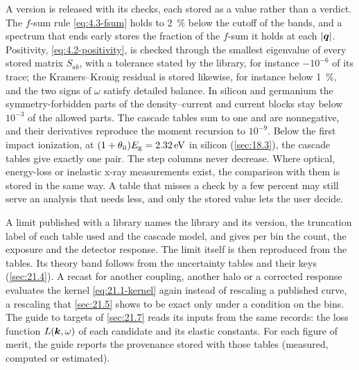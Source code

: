 A version is released with its checks, each stored as a value rather than a verdict. The $f$-sum rule \cref{eq:4.3-fsum} holds to \SI{2}{\percent} below the cutoff of the bands, and a spectrum that ends early stores the fraction of the $f$-sum it holds at each $|\bm{q}|$. Positivity, \cref{eq:4.2-positivity}, is checked through the smallest eigenvalue of every stored matrix $S_{ab}$, with a tolerance stated by the library, for instance $-10^{-6}$ of its trace; the Kramers--Kronig residual is stored likewise, for instance below \SI{1}{\percent}, and the two signs of $\omega$ satisfy detailed balance. In silicon and germanium the symmetry-forbidden parts of the density--current and current blocks stay below $10^{-3}$ of the allowed parts. The cascade tables sum to one and are nonnegative, and their derivatives reproduce the moment recursion to $10^{-9}$. Below the first impact ionization, at $(1 + \theta_{\mathrm{ii}})E_{\mathrm{g}} = \SI{2.32}{eV}$ in silicon (\cref{sec:18.3}), the cascade tables give exactly one pair. The step columns never decrease. Where optical, energy-loss or inelastic x-ray measurements exist, the comparison with them is stored in the same way. A table that misses a check by a few percent may still serve an analysis that needs less, and only the stored value lets the user decide.

A limit published with a library names the library and its version, the truncation label of each table used and the cascade model, and gives per bin the count, the exposure and the detector response. The limit itself is then reproduced from the tables. Its theory band follows from the uncertainty tables and their keys (\cref{sec:21.4}). A recast for another coupling, another halo or a corrected response evaluates the kernel \cref{eq:21.1-kernel} again instead of rescaling a published curve, a rescaling that \cref{sec:21.5} shows to be exact only under a condition on the bins. The guide to targets of \cref{sec:21.7} reads its inputs from the same records: the loss function $L(\bm{k},\omega)$ of each candidate and its elastic constants. For each figure of merit, the guide reports the provenance stored with those tables (measured, computed or estimated).

